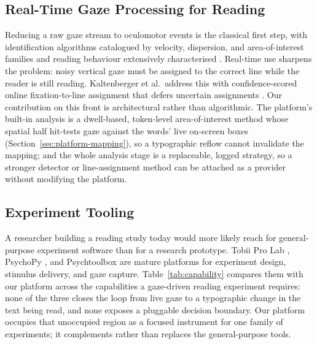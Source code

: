 \subsection{Real-Time Gaze Processing for Reading}

Reducing a raw gaze stream to oculomotor events is the classical first step, with identification algorithms catalogued by velocity, dispersion, and area-of-interest families \cite{salvucci2000identifying} and reading behaviour extensively characterised \cite{rayner1998eyemovements}.
Real-time use sharpens the problem: noisy vertical gaze must be assigned to the correct line while the reader is still reading.
Kaltenberger et al.\ address this with confidence-scored online fixation-to-line assignment that defers uncertain assignments \cite{kaltenberger2026confla}.
Our contribution on this front is architectural rather than algorithmic.
The platform's built-in analysis is a dwell-based, token-level area-of-interest method whose spatial half hit-tests gaze against the words' live on-screen boxes (Section~\ref{sec:platform-mapping}), so a typographic reflow cannot invalidate the mapping; and the whole analysis stage is a replaceable, logged strategy, so a stronger detector or line-assignment method can be attached as a provider without modifying the platform.

\subsection{Experiment Tooling}

A researcher building a reading study today would more likely reach for general-purpose experiment software than for a research prototype.
Tobii Pro Lab \cite{tobii2025prolab}, PsychoPy \cite{peirce2019psychopy}, and Psychtoolbox \cite{brainard1997psychtoolbox} are mature platforms for experiment design, stimulus delivery, and gaze capture.
Table~\ref{tab:capability} compares them with our platform across the capabilities a gaze-driven reading experiment requires: none of the three closes the loop from live gaze to a typographic change in the text being read, and none exposes a pluggable decision boundary.
Our platform occupies that unoccupied region as a focused instrument for one family of experiments; it complements rather than replaces the general-purpose tools.

